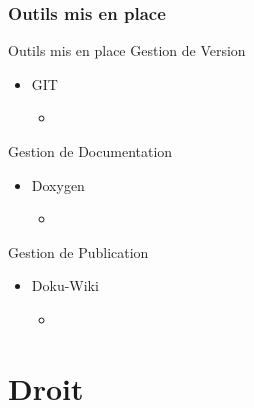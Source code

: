 \documentclass[11pt]{beamer}
\begin{document}
	\subsubsection[]{Outils mis en place}
	\begin{frame}{Outils mis en place}
	Gestion de Version
	\begin{itemize}
	 \item GIT 
	      \begin{itemize}
	      \item \href{https://github.com/estei-master/segment_SOL}{}
	      \end{itemize}
	 \end{itemize}
	 Gestion de Documentation
	 \begin{itemize}
	 \item Doxygen 
	      \begin{itemize}
	      \item \href{http://78.231.214.8/ihm2/html/}{}
	      \end{itemize}
	  \end{itemize}
	  Gestion de Publication 
	  \begin{itemize}
	 \item Doku-Wiki 
	    \begin{itemize}
	    \item \href{http://78.231.214.8/dokuwiki/doku.php}{}
	    \end{itemize}
	\end{itemize}
	
	\end{frame}
	
	
	\section{Droit}
	
\end{document}
